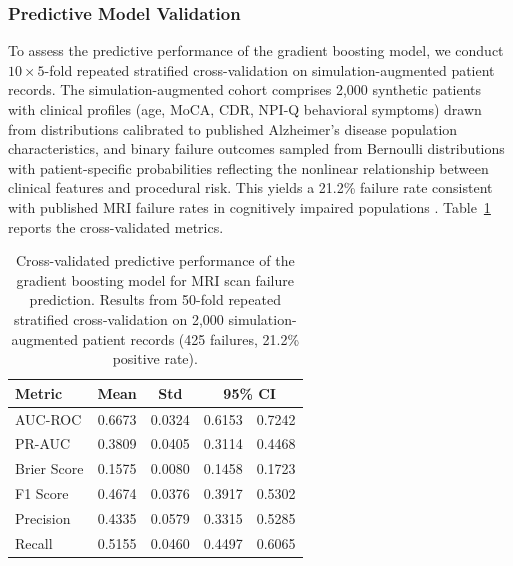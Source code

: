 \documentclass[11pt,a4paper]{article}
\begin{document}
\subsubsection{Predictive Model Validation}

To assess the predictive performance of the gradient boosting model, we conduct $10 \times 5$-fold repeated stratified cross-validation on simulation-augmented patient records. The simulation-augmented cohort comprises 2,000 synthetic patients with clinical profiles (age, MoCA, CDR, NPI-Q behavioral symptoms) drawn from distributions calibrated to published Alzheimer's disease population characteristics, and binary failure outcomes sampled from Bernoulli distributions with patient-specific probabilities reflecting the nonlinear relationship between clinical features and procedural risk. This yields a 21.2\% failure rate consistent with published MRI failure rates in cognitively impaired populations \citep{porembka2025disparities}. Table~\ref{tab:ml_cv_metrics} reports the cross-validated metrics.

\begin{table}[H]
\centering
\caption{Cross-validated predictive performance of the gradient boosting model for MRI scan failure prediction. Results from 50-fold repeated stratified cross-validation on 2,000 simulation-augmented patient records (425 failures, 21.2\% positive rate).}
\label{tab:ml_cv_metrics}
\begin{tabular}{lcccc}
\toprule
Metric & Mean & Std & \multicolumn{2}{c}{95\% CI} \\
\midrule
AUC-ROC & 0.6673 & 0.0324 & 0.6153 & 0.7242 \\
PR-AUC & 0.3809 & 0.0405 & 0.3114 & 0.4468 \\
Brier Score & 0.1575 & 0.0080 & 0.1458 & 0.1723 \\
F1 Score & 0.4674 & 0.0376 & 0.3917 & 0.5302 \\
Precision & 0.4335 & 0.0579 & 0.3315 & 0.5285 \\
Recall & 0.5155 & 0.0460 & 0.4497 & 0.6065 \\
\bottomrule
\end{tabular}
\end{table}
\end{document}
